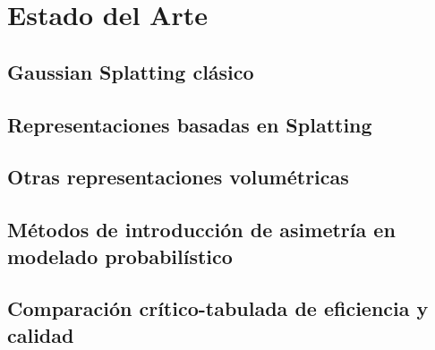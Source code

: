 \chapter{Estado del Arte}\label{chapter:state-of-the-art}

\section{Gaussian Splatting clásico}

\section{Representaciones basadas en Splatting}

\section{Otras representaciones volumétricas}

\section{Métodos de introducción de asimetría en modelado probabilístico}

\section{Comparación crítico-tabulada de eficiencia y calidad}
